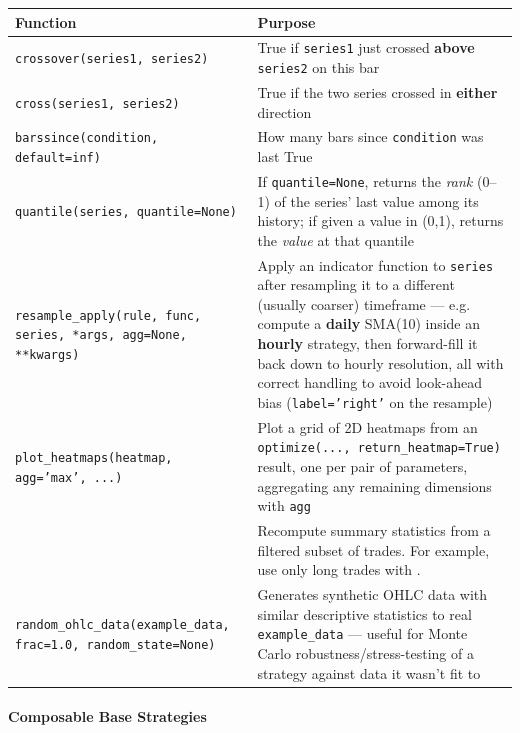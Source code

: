 \documentclass[12pt,openany]{book}
\theoremstyle{definition}
\theoremstyle{remark}
\begin{document}
\begin{longtable}{@{}L{0.46\textwidth}L{0.46\textwidth}@{}}
\toprule
\textbf{Function} & \textbf{Purpose} \\
\midrule
\texttt{crossover(series1, series2)} & True if \texttt{series1} just crossed \textbf{above} \texttt{series2} on this bar \\
\texttt{cross(series1, series2)} & True if the two series crossed in \textbf{either} direction \\
\texttt{barssince(condition, default=inf)} & How many bars since \texttt{condition} was last True \\
\texttt{quantile(series, quantile=None)} & If \texttt{quantile=None}, returns the \emph{rank} (0–1) of the series' last value among its history; if given a value in (0,1), returns the \emph{value} at that quantile \\
\texttt{resample\_apply(rule, func, series, *args, agg=None, **kwargs)} & Apply an indicator function to \texttt{series} after resampling it to a different (usually coarser) timeframe — e.g. compute a \textbf{daily} SMA(10) inside an \textbf{hourly} strategy, then forward-fill it back down to hourly resolution, all with correct handling to avoid look-ahead bias (\texttt{label='right'} on the resample) \\
\texttt{plot\_heatmaps(heatmap, agg='max', ...)} & Plot a grid of 2D heatmaps from an \texttt{optimize(..., return\_heatmap=True)} result, one per pair of parameters, aggregating any remaining dimensions with \texttt{agg} \\
 &
Recompute summary statistics from a filtered subset of trades. For example,
use only long trades with
.
\\
\texttt{random\_ohlc\_data(example\_data, frac=1.0, random\_state=None)} & Generates synthetic OHLC data with similar descriptive statistics to real \texttt{example\_data} — useful for Monte Carlo robustness/stress-testing of a strategy against data it wasn't fit to \\
\bottomrule
\end{longtable}

\paragraph{Composable Base Strategies}
\end{document}
